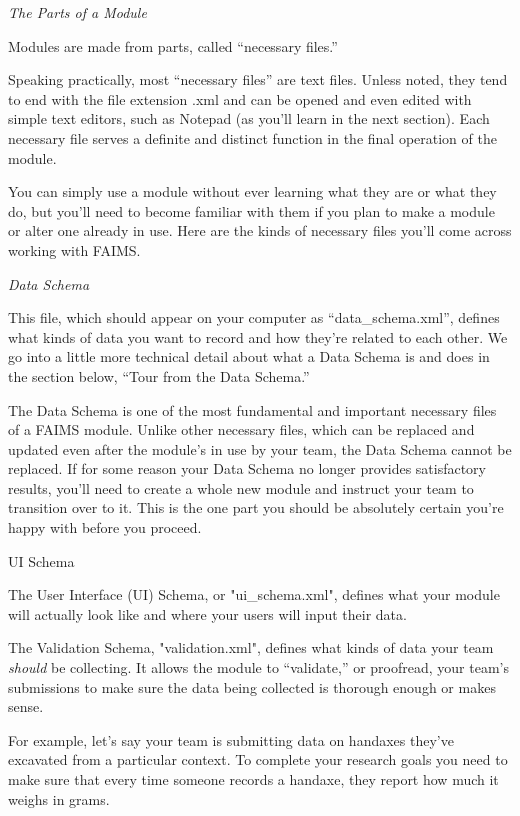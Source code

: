 {\em The Parts of a Module}

Modules are made from parts, called “necessary files.”

Speaking practically, most “necessary files” are text files. Unless noted, they tend to end with the file extension .xml and can be opened and even edited with simple text editors, such as Notepad (as you'll learn in the next section). Each necessary file serves a definite and distinct function in the final operation of the module.

You can simply use a module without ever learning what they are or what they do, but you'll need to become familiar with them if you plan to make a module or alter one already in use. Here are the kinds of necessary files you'll come across working with FAIMS.

{\em Data Schema}

This file, which should appear on your computer as “data_schema.xml”, defines what kinds of data you want to record and how they're related to each other. We go into a little more technical detail about what a Data Schema is and does in the section below, “Tour from the Data Schema.”

The Data Schema is one of the most fundamental and important necessary files of a FAIMS module. Unlike other necessary files, which can be replaced and updated even after the module's in use by your team, the Data Schema cannot be replaced. If for some reason your Data Schema no longer provides satisfactory results, you'll need to create a whole new module and instruct your team to transition over to it. This is the one part you should be absolutely certain you're happy with before you proceed.

UI Schema

The User Interface (UI) Schema, or "ui_schema.xml", defines what your module will actually look like and where your users will input their data.


The Validation Schema, "validation.xml", defines what kinds of data your team {\em should} be collecting. It allows the module to “validate,” or proofread, your team's submissions to make sure the data being collected is thorough enough or makes sense.

For example, let's say your team is submitting data on handaxes they've excavated from a particular context. To complete your research goals you need to make sure that every time someone records a handaxe, they report how much it weighs in grams.

